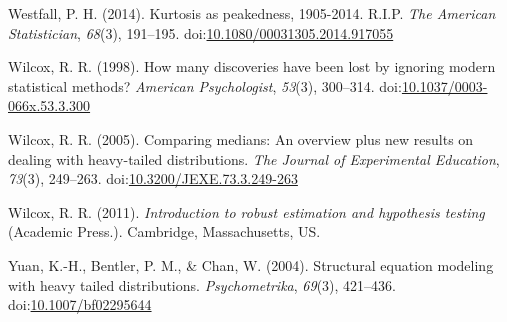 \documentclass[man,floatsintext]{apa6}
\begin{document}
\leavevmode\hypertarget{ref-Westfall_2014}{}%
Westfall, P. H. (2014). Kurtosis as peakedness, 1905-2014. R.I.P. \emph{The American Statistician}, \emph{68}(3), 191--195. doi:\href{https://doi.org/10.1080/00031305.2014.917055}{10.1080/00031305.2014.917055}

\leavevmode\hypertarget{ref-Wilcox_1998}{}%
Wilcox, R. R. (1998). How many discoveries have been lost by ignoring modern statistical methods? \emph{American Psychologist}, \emph{53}(3), 300--314. doi:\href{https://doi.org/10.1037/0003-066x.53.3.300}{10.1037/0003-066x.53.3.300}

\leavevmode\hypertarget{ref-Wilcox_2005}{}%
Wilcox, R. R. (2005). Comparing medians: An overview plus new results on dealing with heavy-tailed distributions. \emph{The Journal of Experimental Education}, \emph{73}(3), 249--263. doi:\href{https://doi.org/10.3200/JEXE.73.3.249-263}{10.3200/JEXE.73.3.249-263}

\leavevmode\hypertarget{ref-Wilcox_2011}{}%
Wilcox, R. R. (2011). \emph{Introduction to robust estimation and hypothesis testing} (Academic Press.). Cambridge, Massachusetts, US.

\leavevmode\hypertarget{ref-Yuan_et_al_2004}{}%
Yuan, K.-H., Bentler, P. M., \& Chan, W. (2004). Structural equation modeling with heavy tailed distributions. \emph{Psychometrika}, \emph{69}(3), 421--436. doi:\href{https://doi.org/10.1007/bf02295644}{10.1007/bf02295644}

\clearpage
\makeatletter
\efloat@restorefloats
\makeatother
\end{document}
